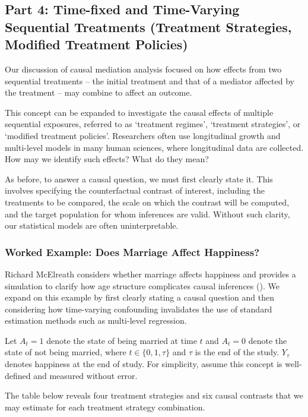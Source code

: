 \documentclass[
  single column]{article}
\begin{document}
\subsection{Part 4: Time-fixed and Time-Varying Sequential Treatments
(Treatment Strategies, Modified Treatment Policies)}\label{id-sec-4}

Our discussion of causal mediation analysis focused on how effects from
two sequential treatments -- the initial treatment and that of a
mediator affected by the treatment -- may combine to affect an outcome.

This concept can be expanded to investigate the causal effects of
multiple sequential exposures, referred to as `treatment regimes',
`treatment strategies', or `modified treatment policies'. Researchers
often use longitudinal growth and multi-level models in many human
sciences, where longitudinal data are collected. How may we identify
such effects? What do they mean?

As before, to answer a causal question, we must first clearly state it.
This involves specifying the counterfactual contrast of interest,
including the treatments to be compared, the scale on which the contrast
will be computed, and the target population for whom inferences are
valid. Without such clarity, our statistical models are often
uninterpretable.

\subsubsection{Worked Example: Does Marriage Affect
Happiness?}\label{worked-example-does-marriage-affect-happiness}

Richard McElreath considers whether marriage affects happiness and
provides a simulation to clarify how age structure complicates causal
inferences (). We expand on this example by first clearly stating a causal
question and then considering how time-varying confounding invalidates
the use of standard estimation methods such as multi-level regression.

Let \(A_t = 1\) denote the state of being married at time \(t\) and
\(A_t = 0\) denote the state of not being married, where
\(t \in \{0, 1, \tau\}\) and \(\tau\) is the end of the study.
\(Y_\tau\) denotes happiness at the end of study. For simplicity, assume
this concept is well-defined and measured without error.

The table below reveals four treatment strategies and six causal
contrasts that we may estimate for each treatment strategy combination.
\end{document}
